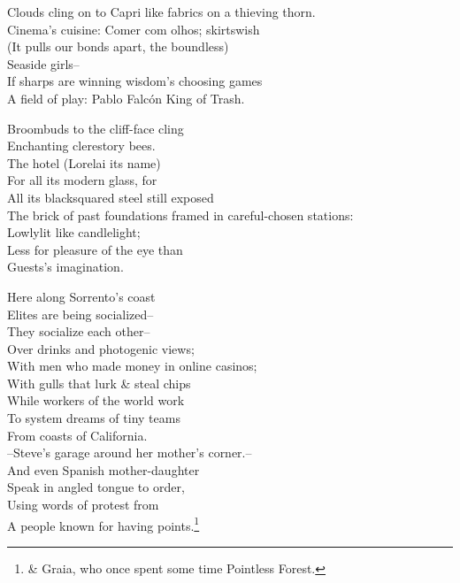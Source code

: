Clouds cling on to Capri like fabrics on a thieving thorn. \\
Cinema's cuisine: Comer com olhos; skirtswish \\
(It pulls our bonds apart, the boundless) \\
Seaside girls-- \\
If sharps are winning wisdom's choosing games \\
A field of play: Pablo Falcón King of Trash.

Broombuds to the cliff-face cling \\
Enchanting clerestory bees. \\
The hotel (Lorelai its name) \\
For all its modern glass, for \\
All its blacksquared steel still exposed \\
The brick of past foundations framed in careful-chosen stations: \\
Lowlylit like candlelight; \\
Less for pleasure of the eye than \\
Guests's imagination.

Here along Sorrento's coast \\
Elites are being socialized-- \\
They socialize each other-- \\
Over drinks and photogenic views; \\
With men who made money in online casinos; \\
With gulls that lurk \& steal chips \\
While workers of the world work \\
To system dreams of tiny teams \\
From coasts of California. \\
--Steve's garage around her mother's corner.-- \\
And even Spanish mother-daughter \\
Speak in angled tongue to order, \\
Using words of protest from \\
A people known for having points.\footnote{\& Graia, who once spent some time Pointless Forest.} 
